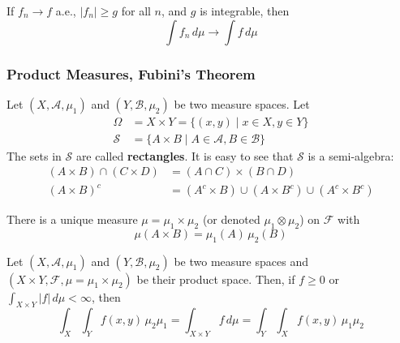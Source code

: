 \documentclass{article}
\begin{document}
      \begin{theorem}
        If $f_n \rightarrow f$ a.e., $|f_n| \geq g$ for all $n$, and $g$ is integrable, then 
        \begin{equation}
          \int f_n \,d\mu \rightarrow \int f\, d\mu
        \end{equation}
      \end{theorem}

    \subsubsection{Product Measures, Fubini's Theorem}

      Let $(X, \mathcal{A}, \mu_1)$ and $(Y, \mathcal{B}, \mu_2)$ be two measure spaces. Let 
      \begin{align*}
        \Omega & = X \times Y = \{(x, y) \mid x \in X, y \in Y\} \\
        \mathcal{S} & = \{A \times B \mid A \in \mathcal{A}, B \in \mathcal{B}\}
      \end{align*}
      The sets in $\mathcal{S}$ are called \textbf{rectangles}. It is easy to see that $\mathcal{S}$ is a semi-algebra: 
      \begin{align*}
        (A \times B) \cap (C \times D) & = (A \cap C) \times (B \cap D) \\
        (A \times B)^c & = (A^c \times B) \cup (A \times B^c) \cup (A^c \times B^c) 
      \end{align*}

      \begin{theorem}
        There is a unique measure $\mu = \mu_1 \times \mu_2$ (or denoted $\mu_1 \otimes \mu_2$) on $\mathcal{F}$ with 
        \begin{equation}
          \mu(A \times B) = \mu_1 (A) \, \mu_2 (B)
        \end{equation}
      \end{theorem}

      \begin{theorem}
        Let $(X, \mathcal{A}, \mu_1)$ and $(Y, \mathcal{B}, \mu_2)$ be two measure spaces and $(X \times Y, \mathcal{F}, \mu = \mu_1 \times \mu_2)$ be their product space. Then, if $f \geq 0$ or $\int_{X \times Y} |f| \,d\mu < \infty$, then 
        \begin{equation}
          \int_X \int_Y f(x, y) \, \mu_2 \mu_1 = \int_{X \times Y} f \,d\mu = \int_Y \int_X f(x, y) \, \mu_1 \mu_2
        \end{equation}
      \end{theorem}
\end{document}
